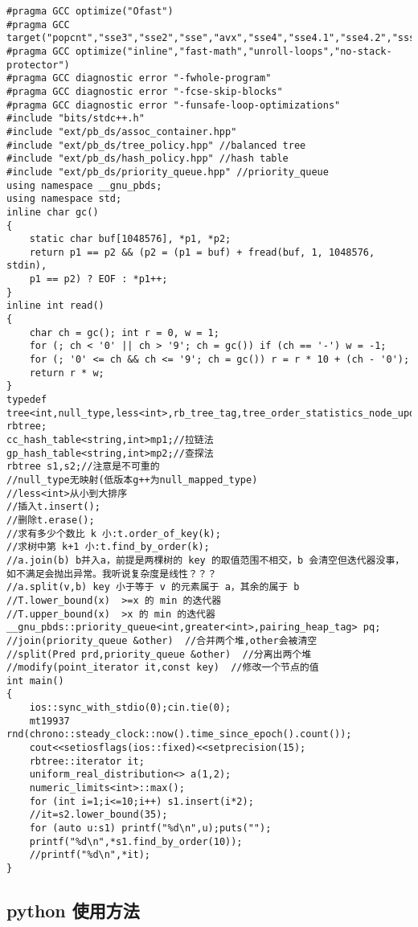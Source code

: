 \documentclass[12pt]{ctexart}
\begin{document}
\begin{lstlisting}
#pragma GCC optimize("Ofast")
#pragma GCC target("popcnt","sse3","sse2","sse","avx","sse4","sse4.1","sse4.2","ssse3","f16c","fma","avx2","xop","fma4")
#pragma GCC optimize("inline","fast-math","unroll-loops","no-stack-protector")
#pragma GCC diagnostic error "-fwhole-program"
#pragma GCC diagnostic error "-fcse-skip-blocks"
#pragma GCC diagnostic error "-funsafe-loop-optimizations"
#include "bits/stdc++.h"
#include "ext/pb_ds/assoc_container.hpp"
#include "ext/pb_ds/tree_policy.hpp" //balanced tree
#include "ext/pb_ds/hash_policy.hpp" //hash table
#include "ext/pb_ds/priority_queue.hpp" //priority_queue
using namespace __gnu_pbds;
using namespace std;
inline char gc()
{
    static char buf[1048576], *p1, *p2;
    return p1 == p2 && (p2 = (p1 = buf) + fread(buf, 1, 1048576, stdin),
    p1 == p2) ? EOF : *p1++;
}
inline int read()
{
    char ch = gc(); int r = 0, w = 1;
    for (; ch < '0' || ch > '9'; ch = gc()) if (ch == '-') w = -1;
    for (; '0' <= ch && ch <= '9'; ch = gc()) r = r * 10 + (ch - '0');
    return r * w;
}
typedef tree<int,null_type,less<int>,rb_tree_tag,tree_order_statistics_node_update> rbtree;
cc_hash_table<string,int>mp1;//拉链法
gp_hash_table<string,int>mp2;//查探法
rbtree s1,s2;//注意是不可重的
//null_type无映射(低版本g++为null_mapped_type)
//less<int>从小到大排序
//插入t.insert();
//删除t.erase();
//求有多少个数比 k 小:t.order_of_key(k);
//求树中第 k+1 小:t.find_by_order(k);
//a.join(b) b并入a，前提是两棵树的 key 的取值范围不相交，b 会清空但迭代器没事，如不满足会抛出异常。我听说复杂度是线性？？？
//a.split(v,b) key 小于等于 v 的元素属于 a，其余的属于 b
//T.lower_bound(x)  >=x 的 min 的迭代器
//T.upper_bound(x)  >x 的 min 的迭代器
__gnu_pbds::priority_queue<int,greater<int>,pairing_heap_tag> pq;
//join(priority_queue &other)  //合并两个堆,other会被清空
//split(Pred prd,priority_queue &other)  //分离出两个堆
//modify(point_iterator it,const key)  //修改一个节点的值
int main()
{
	ios::sync_with_stdio(0);cin.tie(0);
	mt19937 rnd(chrono::steady_clock::now().time_since_epoch().count());
    cout<<setiosflags(ios::fixed)<<setprecision(15);
	rbtree::iterator it;
    uniform_real_distribution<> a(1,2);
	numeric_limits<int>::max();
	for (int i=1;i<=10;i++) s1.insert(i*2);
	//it=s2.lower_bound(35);
	for (auto u:s1) printf("%d\n",u);puts("");
	printf("%d\n",*s1.find_by_order(10));
	//printf("%d\n",*it);
}
\end{lstlisting}

\subsection{python 使用方法}
\end{document}
